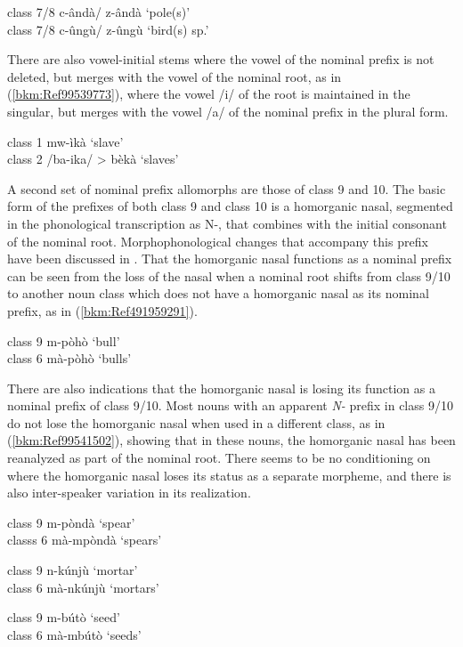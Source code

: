 \ea
\label{bkm:Ref98512328}
\ea 
class 7/8  c-ândà/ z-ândà  ‘pole(s)’\\
\ex class 7/8  c-ûngù/ z-ûngù  ‘bird(s) sp.’
\z\z

There are also vowel-initial stems where the vowel of the nominal prefix is not deleted, but merges with the vowel of the nominal root, as in (\ref{bkm:Ref99539773}), where the vowel /i/ of the root is maintained in the singular, but merges with the vowel /a/ of the nominal prefix in the plural form.

\newpage
\ea
\label{bkm:Ref99539773}
\ea class 1    mw-ìkà    ‘slave’\\
\ex  class 2    /ba-ika/ > bèkà  ‘slaves’
\z\z

A second set of nominal prefix allomorphs are those of class 9 and 10. The basic form of the prefixes of both class 9 and class 10 is a homorganic nasal, segmented in the phonological transcription as N-, that combines with the initial consonant of the nominal root. Morphophonological changes that accompany this prefix have been discussed in . That the homorganic nasal functions as a nominal prefix can be seen from the loss of the nasal when a nominal root shifts from class 9/10 to another noun class which does not have a homorganic nasal as its nominal prefix, as in (\ref{bkm:Ref491959291}).

\ea
\label{bkm:Ref491959291}
\ea class 9    m-pòhò    ‘bull’\\
\ex class 6    mà-pòhò    ‘bulls’
\z\z

There are also indications that the homorganic nasal is losing its function as a nominal prefix of class 9/10. Most nouns with an apparent \textit{N\nobreakdash-} prefix in class 9/10 do not lose the homorganic nasal when used in a different class, as in (\ref{bkm:Ref99541502}), showing that in these nouns, the homorganic nasal has been reanalyzed as part of the nominal root. There seems to be no conditioning on where the homorganic nasal loses its status as a separate morpheme, and there is also inter-speaker variation in its realization.

\ea
\label{bkm:Ref99541502}

\ea
class 9    m-pòndà    ‘spear’\\
classs 6  mà-mpòndà    ‘spears’

\ex
class 9    n-kúnjù    ‘mortar’\\
class 6    mà-nkúnjù    ‘mortars’

\ex
class 9    m-bútò    ‘seed’\\
class 6    mà-mbútò    ‘seeds’
\z\z

